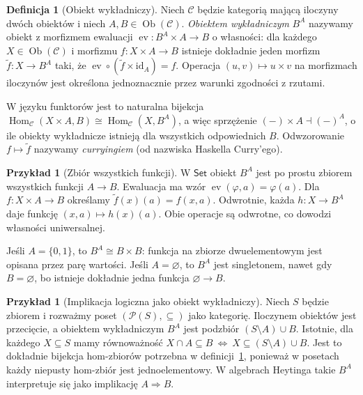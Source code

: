 \documentclass[11pt,a4paper]{article}
\numberwithin{equation}{section}
\theoremstyle{plain}
\theoremstyle{definition}
\newtheorem{definicja}[twierdzenie]{Definicja}
\newtheorem{przyklad}[twierdzenie]{Przykład}
\theoremstyle{remark}
\newcommand{\cat}[1]{\mathsf{#1}}
\newcommand{\Set}{\cat{Set}}
\newcommand{\id}{\mathrm{id}}
\newcommand{\Hom}{\operatorname{Hom}}
\newcommand{\Ob}{\operatorname{Ob}}
\DeclareMathOperator{\ev}{ev}
\begin{document}
\begin{definicja}[Obiekt wykładniczy]\label{def:exponential}
Niech $\mathcal C$ będzie kategorią mającą iloczyny dwóch obiektów i niech $A,B\in\Ob(\mathcal C)$. \emph{Obiektem wykładniczym} $B^A$ nazywamy obiekt z morfizmem ewaluacji $\ev:B^A\times A\to B$ o własności: dla każdego $X\in\Ob(\mathcal C)$ i morfizmu $f:X\times A\to B$ istnieje dokładnie jeden morfizm $\widetilde f:X\to B^A$ taki, że $\ev\circ(\widetilde f\times\id_A)=f$. Operacja $(u,v)\mapsto u\times v$ na morfizmach iloczynów jest określona jednoznacznie przez warunki zgodności z rzutami.
\end{definicja}

W języku funktorów jest to naturalna bijekcja $\Hom_{\mathcal C}(X\times A,B)\cong\Hom_{\mathcal C}(X,B^A)$, a więc sprzężenie $(-)\times A\dashv(-)^A$, o ile obiekty wykładnicze istnieją dla wszystkich odpowiednich $B$. Odwzorowanie $f\mapsto\widetilde f$ nazywamy \emph{curryingiem} (od nazwiska Haskella Curry'ego).

\begin{przyklad}[Zbiór wszystkich funkcji]\label{przyklad:exponential-set}
W $\Set$ obiekt $B^A$ jest po prostu zbiorem wszystkich funkcji $A\to B$. Ewaluacja ma wzór $\ev(\varphi,a)=\varphi(a)$. Dla $f:X\times A\to B$ określamy $\widetilde f(x)(a)=f(x,a)$. Odwrotnie, każda $h:X\to B^A$ daje funkcję $(x,a)\mapsto h(x)(a)$. Obie operacje są odwrotne, co dowodzi własności uniwersalnej.

Jeśli $A=\{0,1\}$, to $B^A\cong B\times B$: funkcja na zbiorze dwuelementowym jest opisana przez parę wartości. Jeśli $A=\varnothing$, to $B^A$ jest singletonem, nawet gdy $B=\varnothing$, bo istnieje dokładnie jedna funkcja $\varnothing\to B$.
\end{przyklad}

\begin{przyklad}[Implikacja logiczna jako obiekt wykładniczy]
Niech $S$ będzie zbiorem i rozważmy poset $(\mathcal P(S),\subseteq)$ jako kategorię. Iloczynem obiektów jest przecięcie, a obiektem wykładniczym $B^A$ jest podzbiór $(S\setminus A)\cup B$. Istotnie, dla każdego $X\subseteq S$ mamy równoważność
$X\cap A\subseteq B\ \Longleftrightarrow\ X\subseteq(S\setminus A)\cup B$.
Jest to dokładnie bijekcja hom-zbiorów potrzebna w definicji~\ref{def:exponential}, ponieważ w posetach każdy niepusty hom-zbiór jest jednoelementowy. W algebrach Heytinga takie $B^A$ interpretuje się jako implikację $A\Rightarrow B$.
\end{przyklad}
\end{document}
